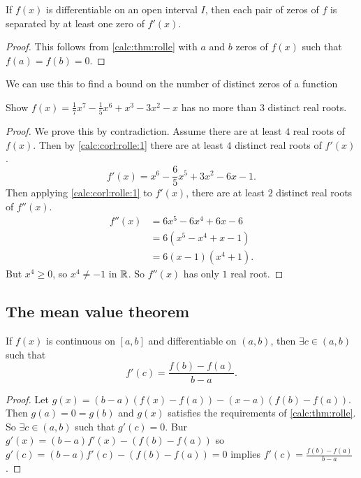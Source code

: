 \documentclass[10pt, a4paper]{article}
\begin{document}
\begin{corollary}\label{calc:corl:rolle:1}
    If $f(x)$ is differentiable on an open interval $I$,
    then each pair of zeros of $f$ is separated by at least one zero of $f'(x)$.
    \begin{proof}
        This follows from \autoref{calc:thm:rolle} with $a$ and $b$ zeros of $f(x)$ such that $f(a) = f(b) = 0$.
    \end{proof}
\end{corollary}
We can use this to find a bound on the number of distinct zeros of a function
\begin{example}
    Show $f(x) = \frac{1}{7}x ^ 7 - \frac{1}{5}x ^ 6 + x ^ 3 - 3x ^ 2 - x$ has no more than $3$ distinct real roots.
    \begin{proof}
        We prove this by contradiction.
        Assume there are at least $4$ real roots of $f(x)$.
        Then by \autoref{calc:corl:rolle:1} there are at least $4$ distinct real roots of $f'(x)$.
        \[
        f'(x) = x ^ 6 - \frac{6}{5}x ^ 5 + 3x ^ 2 - 6x - 1.
        \]
        Then applying \autoref{calc:corl:rolle:1} to $f'(x)$,
        there are at least $2$ distinct real roots of $f''(x)$.
        \begin{align*}
            f''(x) &= 6x ^ 5 - 6x ^ 4 + 6x - 6 \\
            &= 6(x ^ 5 - x ^ 4 + x - 1) \\
            &= 6(x - 1)(x ^ 4 + 1).
        \end{align*}
        But $x ^ 4 \geq 0$, so $x ^ 4 \neq -1$ in $\mathbb{R}$.
        So $f''(x)$ has only $1$ real root.
    \end{proof}
\end{example}

\subsection{The mean value theorem}

\begin{theorem}\label{calc:thm:meanval}
    If $f(x)$ is continuous on $[a, b]$ and differentiable on $(a, b)$,
    then $\exists c \in (a, b)$ such that
    \[
    f'(c) = \frac{f(b) - f(a)}{b - a}.
    \]
    \begin{proof}
        Let $g(x) = (b - a)(f(x) - f(a)) - (x - a)(f(b) - f(a))$.
        Then $g(a) = 0 = g(b)$ and $g(x)$ satisfies the requirements of \autoref{calc:thm:rolle}.
        So $\exists c \in (a, b)$ such that $g'(c) = 0$.
        Bur $g'(x) = (b - a)f'(x) - (f(b) - f(a))$ so $g'(c) = (b - a)f'(c) - (f(b) - f(a)) = 0$
        implies $f'(c) = \frac{f(b) - f(a)}{b - a}$.
    \end{proof}
\end{theorem}
\end{document}
